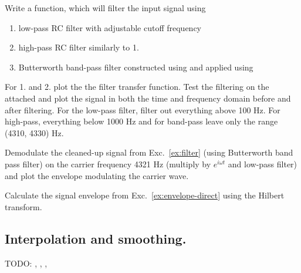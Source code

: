 \begin{exercise}
    \label{ex:filter}
    Write a function, which will filter the input signal using
    \begin{enumerate}
        \item low-pass RC filter with adjustable cutoff frequency
        \item high-pass RC filter similarly to 1.
        \item Butterworth band-pass filter constructed using  and applied using 
    \end{enumerate}

    For 1. and 2. plot the the filter transfer function. Test the filtering on the attached  and plot the signal in both the time and frequency domain before and after filtering. For the low-pass filter, filter out everything above 100 Hz. For high-pass, everything below 1000 Hz and for band-pass leave only the range (4310, 4330) Hz.
\end{exercise}


\begin{exercise}
    \label{ex:envelope-direct}
    Demodulate the cleaned-up signal from Exc.~\ref{ex:filter} (using Butterworth band pass filter) on the carrier frequency 4321 Hz (multiply by $e^{i\omega t}$ and low-pass filter) and plot the envelope modulating the carrier wave.
\end{exercise}

\begin{exercise}
    \label{ex:envelope-hilbert}
    Calculate the signal envelope from Exc.~\ref{ex:envelope-direct} using the Hilbert transform.
\end{exercise}

\subsection{Interpolation and smoothing.}

TODO: , , , 